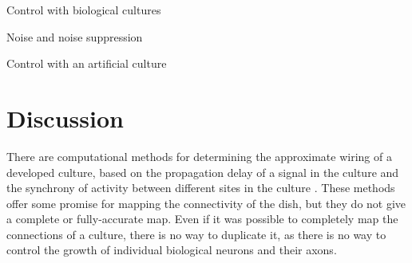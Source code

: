 \documentclass[letterpaper]{article}
\begin{document}
Control with biological cultures

Noise and noise suppression

Control with an artificial culture

\section{Discussion}

There are computational methods for determining the approximate wiring of a developed culture, based on the propagation delay of a signal in the culture and the synchrony of activity between different sites in the culture  \cite{erickson2008caged,esposti2008estimation}. 
These methods offer some promise for mapping the connectivity of the dish, but they do not give a complete or fully-accurate map. 
Even if it was possible to completely map the connections of a culture, there is no way to duplicate it, as there is no way to control the growth of individual biological neurons and their axons. 



\end{document}
